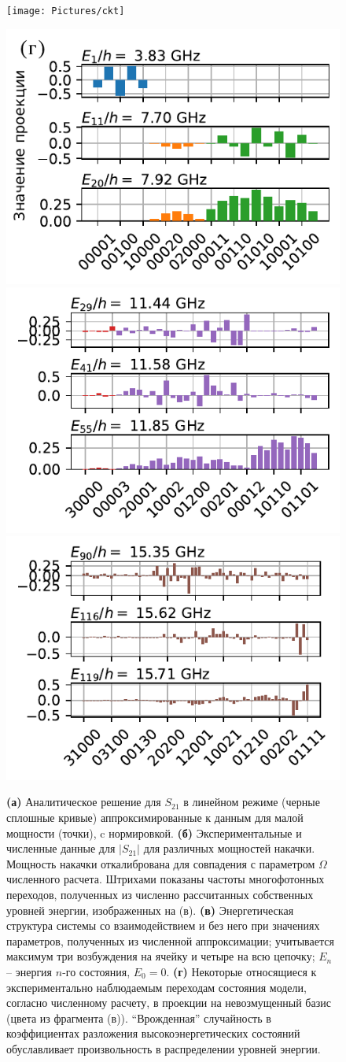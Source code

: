 \documentclass[14pt, a4paper]{extreport}
\numberwithin{equation}{section}
\begin{document}
\begin{figure}[h!]
	\texttt{[image: Pictures/ckt]}
	
	\includegraphics[width=.329\linewidth]{Pictures/eigenstates1}
	\includegraphics[width=.329\linewidth]{Pictures/eigenstates2}
	\includegraphics[width=.329\linewidth]{Pictures/eigenstates3}
	\caption{\textbf{(а)} Аналитическое решение для $S_{21}$ в линейном режиме (черные сплошные кривые) аппроксимированные к данным для малой мощности (точки), c нормировкой. \textbf{(б)} Экспериментальные и численные данные для $|S_{21}|$ для различных мощностей накачки. Мощность накачки откалибрована для совпадения с параметром $\Omega$ численного расчета. Штрихами показаны частоты многофотонных переходов, полученных из численно рассчитанных собственных уровней энергии, изображенных на (в). \textbf{(в)} Энергетическая структура системы со взаимодействием и без него при значениях параметров, полученных из численной аппроксимации; учитывается максимум три возбуждения на ячейку и четыре на всю цепочку; $E_n$ -- энергия $n$-го состояния, $E_0 =0$. \textbf{(г)} Некоторые относящиеся к экспериментально наблюдаемым переходам состояния модели, согласно численному расчету, в проекции на невозмущенный базис (цвета из фрагмента (в)). ``Врожденная'' случайность в коэффициентах разложения высокоэнергетических состояний обуславливает произвольность в распределении уровней энергии.}
	\label{fig:ckt}
\end{figure}
\end{document}
